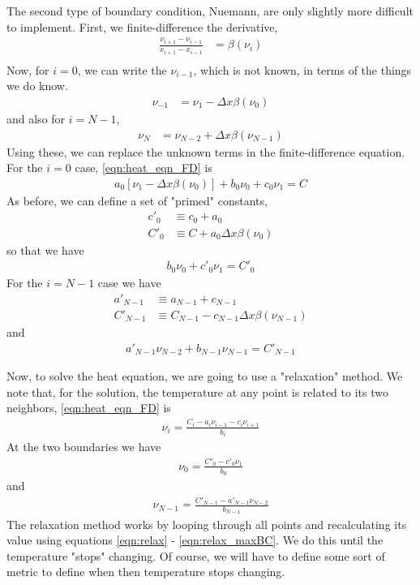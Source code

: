 \documentclass[letterpaper,12pt]{article}
\newcommand{\func}[1]{\left(#1\right)}
\begin{document}
The second type of boundary condition, Nuemann, are only slightly more difficult to implement. First, we finite-difference the derivative,
\begin{align}
  \frac{\nu_{i+1} - \nu_{i-1}}{x_{i+1} - x_{i-1}} &= \beta\func{\nu_i}\\
\end{align}
Now, for $i=0$, we can write the $\nu_{i-1}$, which is not known, in terms of the things we do know.
\begin{align}
   \nu_{-1} &= \nu_{1} - \Delta x \beta\func{\nu_0}
\end{align}
and also for $i=N-1$,
\begin{align}
  \nu_{N} &= \nu_{N-2} + \Delta x \beta\func{\nu_{N-1}}
\end{align}
Using these, we can replace the unknown terms in the finite-difference equation. For the $i=0$ case,
\ref{eqn:heat_eqn_FD} is
\begin{align}
  a_0 \left[ \nu_{1} - \Delta x \beta\func{\nu_0} \right]
 +b_0 \nu_{0  }
 +c_0 \nu_{1}
= C
\end{align}
As before, we can define a set of "primed" constants,
\begin{align}
  c'_0&\equiv c_0 + a_0\\
  C'_0&\equiv  C + a_0 \Delta x \beta\func{\nu_0}
\end{align}
so that we have
\begin{align}
  b_0 \nu_{0}
 +c'_0 \nu_{1}
= C'_0
\end{align}
For the $i=N-1$ case we have
\begin{align}
  a'_{N-1}&\equiv a_{N-1} + c_{N-1} \\
  C'_{N-1}&\equiv  C_{N-1} - c_{N-1} \Delta x \beta\func{\nu_{N-1}}
\end{align}
and
\begin{align}
  a'_{N-1} \nu_{N-2}
+ b_{N-1} \nu_{N-1}
= C'_{N-1}
\end{align}

Now, to solve the heat equation, we are going to use a "relaxation" method. We
note that, for the solution, the temperature at any point is related to its two
neighbors,
\ref{eqn:heat_eqn_FD} is
\begin{align}
  \label{eqn:relax}
 \nu_{i  }
 = \frac{C_{i} - a_i \nu_{i-1} - c_i \nu_{i+1}}{b_i}
\end{align}
At the two boundaries we have
\begin{align}
  \label{eqn:relax_minBC}
 \nu_{0  } = \frac{C'_{0} -  c'_0 \nu_{1}}{b_0}
\end{align}
and
\begin{align}
  \label{eqn:relax_maxBC}
  \nu_{N-1} = \frac{C'_{N-1} -  a'_{N-1} \nu_{N-2}}{b_{N-1}}
\end{align}
The relaxation method works by looping through all points and recalculating its value using equations \ref{eqn:relax} - \ref{eqn:relax_maxBC}. We do this until the temperature "stops" changing. Of course, we will have to define some sort of metric to define when then temperature stops changing.
\end{document}

